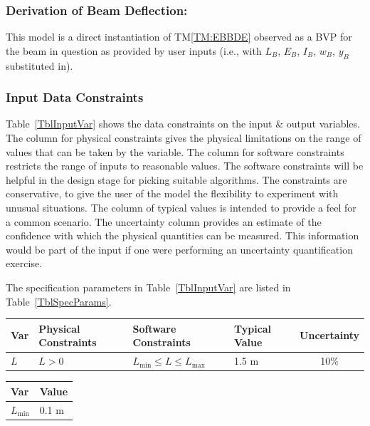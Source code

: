 \documentclass[12pt]{article}
\newcommand{\tref}[1]{TM\ref{#1}}
\begin{document}
\subsubsection*{Derivation of Beam Deflection:}

This model is a direct instantiation of \tref{TM:EBBDE} observed as a BVP for
the beam in question as provided by user inputs (i.e., with $L_B$, $E_B$, $I_B$,
$w_B$, $y_B$ substituted in).

\subsubsection{Input Data Constraints}
\label{sec_DataConstraints}

Table~\ref{TblInputVar} shows the data constraints on the input \& output
variables.  The column for physical constraints gives the physical limitations
on the range of values that can be taken by the variable.  The column for
software constraints restricts the range of inputs to reasonable values.  The
software constraints will be helpful in the design stage for picking suitable
algorithms.  The constraints are conservative, to give the user of the model the
flexibility to experiment with unusual situations.  The column of typical values
is intended to provide a feel for a common scenario.  The uncertainty column
provides an estimate of the confidence with which the physical quantities can be
measured.  This information would be part of the input if one were performing an
uncertainty quantification exercise.

The specification parameters in Table~\ref{TblInputVar} are listed in
Table~\ref{TblSpecParams}.

\begin{table}[!h]
    \caption{Input Variables} \label{TblInputVar}
    \renewcommand{\arraystretch}{1.2}
    \noindent
    \begin{longtable*}{l l l l c}
        \toprule
        \textbf{Var} & \textbf{Physical Constraints} & \textbf{Software Constraints} & \textbf{Typical Value} & \textbf{Uncertainty}\\
        \midrule
        $L$          & $L > 0$                       & $L_{\text{min}} \leq L \leq L_{\text{max}}$ & 1.5 \si[per-mode=symbol]{\metre} & 10\%
        \\
        \bottomrule
    \end{longtable*}
\end{table}

\begin{table}[!h]
    \caption{Specification Parameter Values} \label{TblSpecParams}
    \renewcommand{\arraystretch}{1.2}
    \noindent \begin{longtable*}{l l}
        \toprule
        \textbf{Var} & \textbf{Value} \\
        \midrule
        $L_\text{min}$ & 0.1 \si{\metre}\\
        \bottomrule
    \end{longtable*}
\end{table}
\end{document}
